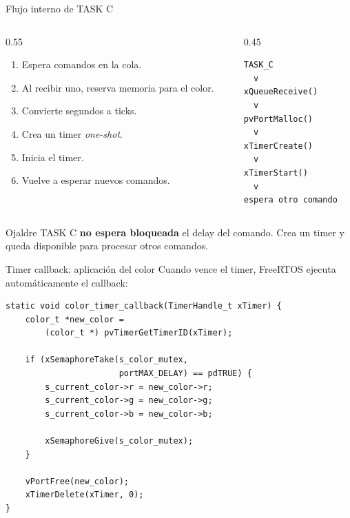 \documentclass[10pt, aspectratio=169]{beamer} %
\begin{document}
\begin{frame}[fragile]{Flujo interno de TASK C}
    \begin{columns}
        \begin{column}{0.55\textwidth}
            \begin{enumerate}
                \item Espera comandos en la cola.
                \item Al recibir uno, reserva memoria para el color.
                \item Convierte segundos a ticks.
                \item Crea un timer \textit{one-shot}.
                \item Inicia el timer.
                \item Vuelve a esperar nuevos comandos.
            \end{enumerate}
        \end{column}

        \begin{column}{0.45\textwidth}
\begin{verbatim}
TASK_C
  v
xQueueReceive()
  v
pvPortMalloc()
  v
xTimerCreate()
  v
xTimerStart()
  v
espera otro comando
\end{verbatim}
        \end{column}
    \end{columns}

    \vspace{2mm}

    \begin{block}{Ojaldre}
        TASK C \textbf{no espera bloqueada} el delay del comando. Crea un timer y queda disponible para procesar otros comandos.
    \end{block}
\end{frame}

\begin{frame}[fragile]{Timer callback: aplicación del color}
Cuando vence el timer, FreeRTOS ejecuta automáticamente el callback:

\begin{lstlisting}
static void color_timer_callback(TimerHandle_t xTimer) {
    color_t *new_color =
        (color_t *) pvTimerGetTimerID(xTimer);

    if (xSemaphoreTake(s_color_mutex,
                       portMAX_DELAY) == pdTRUE) {
        s_current_color->r = new_color->r;
        s_current_color->g = new_color->g;
        s_current_color->b = new_color->b;

        xSemaphoreGive(s_color_mutex);
    }

    vPortFree(new_color);
    xTimerDelete(xTimer, 0);
}
\end{lstlisting}
\end{frame}
\end{document}
